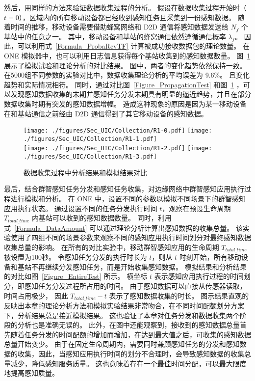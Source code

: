 然后，用同样的方法来验证数据收集过程的分析。
假设在数据收集过程开始时（$t=0$），区域内的所有移动设备都已经收到感知任务且采集到一份感知数据。
随着时间的推移，移动设备需要借助蜂窝网络和 D2D 通信将感知数据发送给 $N_f$ 个基站中的任意之一。
其中，移动设备和基站的蜂窝通信依然遵循通信概率 $\lambda_f$。
因此，可以利用式~\eqref{Formula_ProbaRcvTF} 计算被成功接收数据包的理论数量。
在 ONE 模拟器中，也可以利用日志信息获得每个基站收集到的感知数据数量。
图~\ref{Figure_CollectionTest} 展示了模拟试验和理论分析的对比结果。
图中，两者的变化趋势依然保持一致。
在5000组不同参数的实验对比中，数据收集理论分析的平均误差为 9.6\%。
且变化趋势和实际情况相符。
同时，通过对比图~\ref{Figure_PropagationTest} 和图~\ref{Figure_CollectionTest} ，可以发现感知数据收集的末期并感知任务分发末期具有明显的逼近趋势，并且在部分数据收集时期有突发的感知数据增幅。
造成这种现象的原因是因为某一移动设备在和基站通信之前经由 D2D 通信得到了其它移动设备的感知数据。

\begin{figure}[!h]
  \centering
  {\texttt{[image: ./figures/Sec\_UIC/Collection/R1-0.pdf]}}
  {\texttt{[image: ./figures/Sec\_UIC/Collection/R1-1.pdf]}}\\
  {\texttt{[image: ./figures/Sec\_UIC/Collection/R1-2.pdf]}}
  {\texttt{[image: ./figures/Sec\_UIC/Collection/R1-3.pdf]}}
  \vspace{-0.5em}
  \caption{数据收集过程中分析结果和模拟结果对比}
  \vspace{-0.5em}
  \label{Figure_CollectionTest}
\end{figure}

最后，结合群智感知任务分发和感知任务收集，对边缘网络中群智感知应用执行过程进行模拟和分析。
在 ONE 中，设置不同的参数以模拟不同场景下的群智感知应用执行状态。
通过设置不同的任务分发执行时间 $t$，观察在预设生命周期 $T_{total\_time}$ 内基站可以收到的感知数据数量。
同时，利用式~\ref{Formula_DataAmount} 可以通过理论分析计算出感知数据的收集总量。
该实验使用了四组不同的场景参数来观察不同的感知应用执行时间划分对最终感知数据收集总量的影响。
在所有的对比实验中，移动群智感知应用的生命周期 $T_{total\_time}$ 被设置为100秒。
令感知任务分发的执行时长为 $t$，则从 $t$ 时刻开始，所有移动设备和基站不再继续分发感知任务，而是开始收集感知数据。
模拟结果和分析结果的对比如图~\ref{Figure_EntireTest} 所示。
横坐标 $t$ 表示感知应用执行过程的时间划分，即感知任务分发过程所占用的时间。
由于感知数据可以直接从传感器读取，时间占用极少，
因此 $T_{total\_time} - t$  表示了感知数据收集的时长。
图示结果直观的反映出本章的理论分析方法和模拟实验结果非常吻合，在不同时间配额划分方案下，分析结果总是接近模拟结果。
这也验证了本章对任务分发和数据收集两个阶段的分析也是准确无误的。
此外，在图中还能观察到，接收到的感知数据总量首先随着任务分发的时间配额的增加而增加，在达到最大值之后，可收集的感知数据总量开始变少。
由于在固定生命周期内，需要同时兼顾感知任务的分发和感知数据的收集，因此，当感知应用执行时间的划分不合理时，会导致感知数据的收集总量减少，降低感知服务质量。
这也意味着存在一个最佳时间分配，可以最大限度地提高感知质量。

